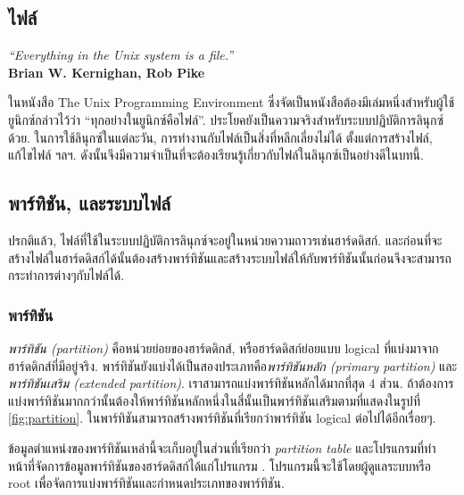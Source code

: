 \begin{thwbr}
\chapter{ไฟล์}
\begin{flushright}
{\it\latintext ``Everything in the Unix system is a file.''}\\
{\bf\latintext  Brian W. Kernighan, Rob Pike \cite{upe}}
\end{flushright}

ในหนังสือ The Unix Programming Environment \cite{upe} ซึ่งจัดเป็นหนังสือต้องมีเล่มหนึ่งสำหรับผู้ใช้ยูนิกซ์กล่าวไว้ว่า ``ทุกอย่างในยูนิกซ์คือไฟล์''. ประโยคยังเป็นความจริงสำหรับระบบปฏิบัติการลินุกซ์ด้วย. ในการใช้ลินุกซ์ในแต่ละวัน, การทำงานกับไฟล์เป็นสิ่งที่หลีกเลี่ยงไม่ได้ ตั้งแต่การสร้างไฟล์, แก้ไขไฟล์ ฯลฯ. ดังนั้นจึงมีความจำเป็นที่จะต้องเรียนรู้เกี่ยวกับไฟล์ในลินุกซ์เป็นอย่างดีในบทนี้.


\section{พาร์ทิชัน, และระบบไฟล์}
ปรกติแล้ว, ไฟล์ที่ใช้ในระบบปฏิบัติการลินุกซ์จะอยู่ในหน่วยความถาวรเช่นฮาร์ดดิสก์. และก่อนที่จะสร้างไฟล์ในฮาร์ดดิสก์ได้นั้นต้องสร้างพาร์ทิชันและสร้างระบบไฟล์ให้กับพาร์ทิชันนั้นก่อนจึงจะสามารถกระทำการต่างๆกับไฟล์ได้.

\subsection{พาร์ทิชัน}
\emph{พาร์ทิชัน (partition)} คือหน่วยย่อยของฮาร์ดดิกส์, หรือฮาร์ดดิสก์ย่อยแบบ logical ที่แบ่งมาจากฮาร์ดดิกส์ที่มีอยู่จริง. พาร์ทิชันยังแบ่งได้เป็นสองประเภทคือ\emph{พาร์ทิชันหลัก (primary partition)} และ\emph{พาร์ทิชันเสริม (extended partition)}. เราสามารถแบ่งพาร์ทิชันหลักได้มากที่สุด 4 ส่วน. ถ้าต้องการแบ่งพาร์ทิชันมากกว่านั้นต้องให้พาร์ทิชันหลักหนึ่งในสี่นั้นเป็นพาร์ทิชันเสริมตามที่แสดงในรูปที่ \ref{fig:partition}. ในพาร์ทิชันสามารถสร้างพาร์ทิชันที่เรียกว่าพาร์ทิชัน logical ต่อไปได้อีกเรื่อยๆ.


\begin{figure}[!htbp]
\end{figure}

ข้อมูลตำแหน่งของพาร์ทิชันเหล่านี้จะเก็บอยู่ในส่วนที่เรียกว่า \emph{partition table} และโปรแกรมที่ทำหน้าที่จัดการข้อมูลพาร์ทิชันของฮาร์ดดิสก์ได้แก่โปรแกรม . โปรแกรมนี้จะใช้โดยผู้ดูแลระบบหรือ root เพื่อจัดการแบ่งพาร์ทิชันและกำหนดประเภทของพาร์ทิชัน. 


\end{thwbr}

